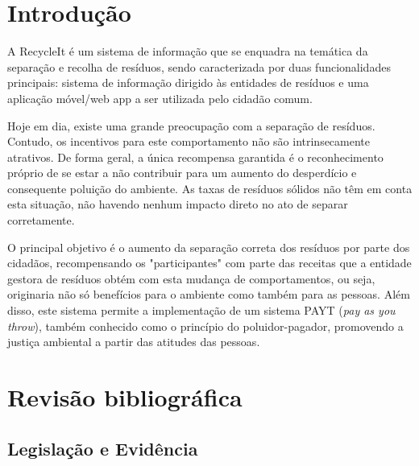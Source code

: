 \documentclass[11pt, a4paper, oneside]{book}
\begin{document}
\frontmatter

{
\linespread{1.000}

\tableofcontents
}

\mainmatter

\chapter{Introdução}

A RecycleIt é um sistema de informação que se enquadra na temática da separação e recolha de resíduos, sendo caracterizada por duas funcionalidades principais: sistema de informação dirigido às entidades de resíduos e uma aplicação móvel/web app a ser utilizada pelo cidadão comum.

Hoje em dia, existe uma grande preocupação com a separação de resíduos. Contudo, os incentivos para este comportamento não são intrinsecamente atrativos. De forma geral, a única recompensa garantida é o reconhecimento próprio de se estar a não contribuir para um aumento do desperdício e consequente poluição do ambiente. As taxas de resíduos sólidos não têm em conta esta situação, não havendo nenhum impacto direto no ato de separar corretamente.

O principal objetivo é o aumento da separação correta dos resíduos por parte dos cidadãos, recompensando os "participantes"{} com parte das receitas que a entidade gestora de resíduos obtém com esta mudança de comportamentos, ou seja, originaria não só benefícios para o ambiente como também para as pessoas. Além disso, este sistema permite a implementação de um sistema PAYT (\textit{pay as you throw}), também conhecido como o princípio do poluidor-pagador, promovendo a justiça ambiental a partir das atitudes das pessoas.

\chapter{Revisão bibliográfica}

\section{Legislação e Evidência}
\end{document}

